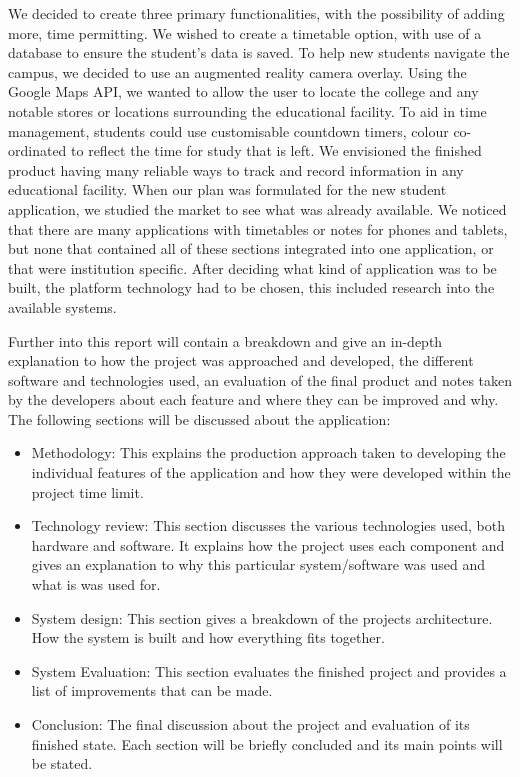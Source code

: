 We decided to create three primary functionalities, with the possibility of adding more, time permitting. We wished to create a timetable option, with use of a database to ensure the student’s data is saved. To help new students navigate the campus, we decided to use an augmented reality camera overlay. Using the Google Maps API, we wanted to allow the user to locate the college and any notable stores or locations surrounding the educational facility. To aid in time management, students could use customisable countdown timers, colour co-ordinated to reflect the time for study that is left. 
We envisioned the finished product having many reliable ways to track and record information in any educational facility. When our plan was formulated for the new student application, we studied the market to see what was already available. We noticed that there are many applications with timetables or notes for phones and tablets, but none that contained all of these sections integrated into one application, or that were institution specific. After deciding what kind of application was to be built, the platform technology had to be chosen, this included research into the available systems.
 
Further into this report will contain a breakdown and give an in-depth explanation to how the project was approached and developed, the different software and technologies used, an evaluation of the final product and notes taken by the developers about each feature and where they can be improved and why. The following sections will be discussed about the application:
\begin{itemize}
\item Methodology: This explains the production approach taken to developing the individual features of the application and how they were developed within the project time limit.
\item Technology review: This section discusses the various technologies used, both hardware and software. It explains how the project uses each component and gives an explanation to why this particular system/software was used and what is was used for.
\item System design: This section gives a breakdown of the projects architecture. How the system is built and how everything fits together.
\item System Evaluation: This section evaluates the finished project and provides a list of improvements that can be made.
\item Conclusion: The final discussion about the project and evaluation of its finished state. Each section will be briefly concluded and its main points will be stated.
\end{itemize}

